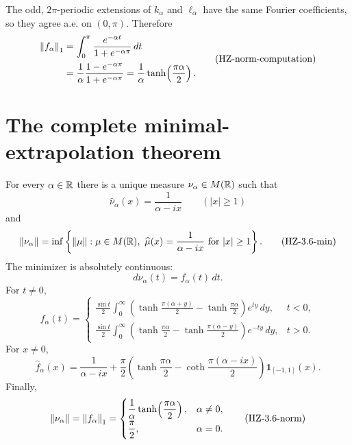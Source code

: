 The odd, $2\pi$-periodic extensions of $k_\alpha$ and $\ell_\alpha$ have the same Fourier coefficients, so they agree a.e. on $(0,\pi)$. Therefore
\[
\begin{aligned}
  \left\lVert f_\alpha\right\rVert_1
  &=\int_0^\pi\frac{e^{-\alpha t}}{1+e^{-\alpha\pi}}\,dt\\
  &=\frac1\alpha\frac{1-e^{-\alpha\pi}}{1+e^{-\alpha\pi}}
   =\frac1\alpha\tanh\!\left(\frac{\pi\alpha}{2}\right).
\end{aligned}
\tag{HZ-norm-computation}\label{HZ-norm-computation}
\]

\section{The complete minimal-extrapolation theorem}


\begin{theorem}
For every $\alpha\in\mathbb{R}$ there is a unique measure $\nu_\alpha\in M(\mathbb{R})$ such that
\[
  \widehat\nu_\alpha(x)=\frac1{\alpha-ix}
  \qquad(|x|\ge1)
  \tag{HZ-3.6-data}\label{HZ-3.6-data}
\]
and
\[
  \norm{\nu_\alpha}
  =\inf\left\{\norm\mu:
      \mu\in M(\R),\ 
      \widehat\mu(x)=\frac1{\alpha-ix}\text{ for }|x|\ge1
    \right\}.
  \tag{HZ-3.6-min}\label{HZ-3.6-min}
\]
The minimizer is absolutely continuous:
\[
  d\nu_\alpha(t)=f_\alpha(t)\,dt.
\]
For $t\ne0$,
\[
 f_\alpha(t)=
 \begin{cases}
 \displaystyle
 \frac{\sin t}{2}\int_0^\infty
 \left(
  \tanh\!\frac{\pi(\alpha+y)}2-
  \tanh\!\frac{\pi\alpha}2
 \right)e^{ty}\,dy,
 &t<0,\\[2.2ex]
 \displaystyle
 \frac{\sin t}{2}\int_0^\infty
 \left(
  \tanh\!\frac{\pi\alpha}2-
  \tanh\!\frac{\pi(\alpha-y)}2
 \right)e^{-ty}\,dy,
 &t>0.
 \end{cases}
 \tag{HZ-3.6-f}\label{HZ-3.6-f}
\]
For $x\ne0$,
\[
  \widehat f_\alpha(x)
  =\frac1{\alpha-ix}
   +\frac\pi2\left(
      \tanh\!\frac{\pi\alpha}{2}
      -\coth\!\frac{\pi(\alpha-ix)}{2}
    \right)\mathbf1_{[-1,1]}(x).
  \tag{HZ-3.6-Fourier}\label{HZ-3.6-Fourier}
\]
Finally,
\[
  \left\lVert \nu_\alpha\right\rVert=\left\lVert f_\alpha\right\rVert_1
  =
  \begin{cases}
    \displaystyle\frac1\alpha\tanh\!\left(\frac{\pi\alpha}{2}\right),
      &\alpha\ne0,\\[1.1ex]
    \displaystyle\frac\pi2,&\alpha=0.
  \end{cases}
  \tag{HZ-3.6-norm}\label{HZ-3.6-norm}
\]
\end{theorem}

